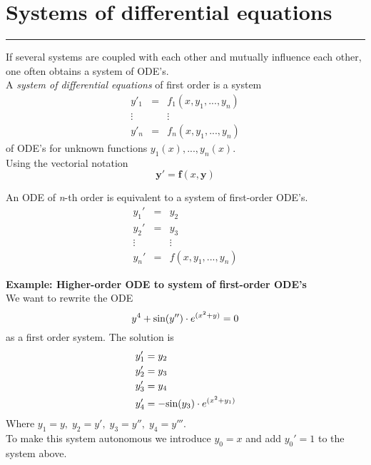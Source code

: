 \section{Systems of differential equations}
\noindent\rule[\linienAbstand]{\linewidth}{\linienDickeDick}
If several systems are coupled with each other and mutually influence each other, one often obtains a system of ODE’s.\\
A \emph{system of differential equations} of first order is a system
\begin{equation}
  \begin{matrix}
    y'_1 & = & f_1(x, y_1,...,y_n)\\
    \vdots & & \vdots \;\;\;\;\; \; \; \; \; \; \; \; \; \; \; \; \; \; \\
    y'_n & = & f_n(x, y_1,...,y_n)
\end{matrix}
\end{equation}
of ODE’s for unknown functions $y_1(x), ... , y_n(x)$.\\
Using the vectorial notation
\begin{equation}
  \mathbf{y}' = \mathbf{f}(x, \mathbf{y})
\end{equation}

An ODE of \emph{n}-th order is equivalent to a system of first-order ODE's.
\begin{equation}
  \begin{matrix}
    y_1' & = & y_2\\
    y_2' & = & y_3\\
    \vdots  &  & \vdots \\
    y_n' & = & f(x, y_1, ..., y_n)
  \end{matrix}
\end{equation}

\textbf{Example: Higher-order ODE to system of first-order ODE's}\\
We want to rewrite the ODE
\begin{equation}
  y^4 + \textup{sin}(y'') \cdot e^{(x^2 + y)} = 0
\end{equation}
as a first order system. The solution is
\begin{equation}
  \begin{split}
    y_1' &= y_2\\
    y_2' &= y_3\\
    y_3' &= y_4 \\
    y_4' &= - \textup{sin}(y_3) \cdot e^{(x^2 + y_1)}
  \end{split}
\end{equation}
Where $y_1 = y,\; y_2 = y',\; y_3 = y'',\; y_4 = y'''$.\\
To make this system autonomous we introduce $y_0 = x$ and add $y_0' = 1$ to the system above.\\

